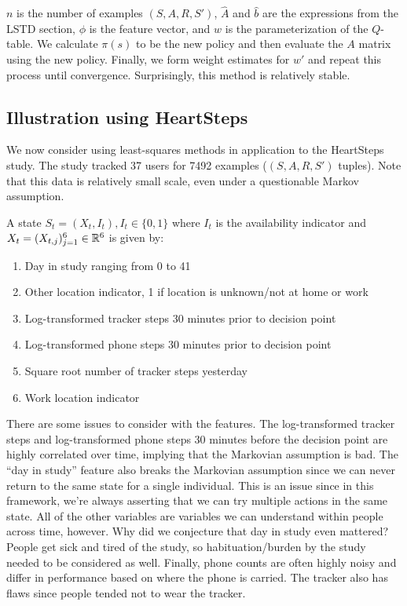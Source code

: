\documentclass[11pt]{article}
\begin{document}
\noindent $n$ is the number of examples $(S, A, R, S')$, $\hat{A}$ and $\hat{b}$ are the expressions from the LSTD section, $\phi$ is the feature vector, and $w$ is the parameterization of the $Q$-table. We calculate $\pi(s)$ to be the new policy and then evaluate the $A$ matrix using the new policy. Finally, we form weight estimates for $w'$ and repeat this process until convergence. Surprisingly, this method is relatively stable.

\subsection{Illustration using HeartSteps}

We now consider using least-squares methods in application to the HeartSteps study. The study tracked 37 users for 7492 examples ($(S,A,R,S')$ tuples). Note that this data is relatively small scale, even under a questionable Markov assumption.

A state $S_t = (X_t, I_t), I_t \in \{0, 1\}$ where $I_t$ is the availability indicator and $X_t = (X_{t,j})_{j=1}^6 \in \mathbb{R}^6$ is given by:

\begin{enumerate}
\item Day in study ranging from 0 to 41
\item Other location indicator, 1 if location is unknown/not at home or work
\item Log-transformed tracker steps 30 minutes prior to decision point
\item Log-transformed phone steps 30 minutes prior to decision point
\item Square root number of tracker steps yesterday
\item Work location indicator
\end{enumerate}

There are some issues to consider with the features. The log-transformed tracker steps and log-transformed phone steps 30 minutes before the decision point are highly correlated over time, implying that the Markovian assumption is bad. The ``day in study'' feature also breaks the Markovian assumption since we can never return to the same state for a single individual. This is an issue since in this framework, we're always asserting that we can try multiple actions in the same state. All of the other variables are variables we can understand within people across time, however. Why did we conjecture that day in study even mattered? People get sick and tired of the study, so habituation/burden by the study needed to be considered as well. Finally, phone counts are often highly noisy and differ in performance based on where the phone is carried. The tracker also has flaws since people tended not to wear the tracker.
\end{document}
